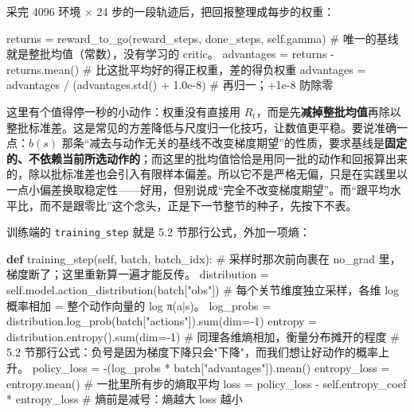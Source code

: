 \documentclass[
  chinese,
]{ctexart}
\newenvironment{Shaded}{\begin{snugshade}}{\end{snugshade}}
\newcommand{\BuiltInTok}[1]{\textcolor[rgb]{0.00,0.23,0.31}{#1}}
\newcommand{\CommentTok}[1]{\textcolor[rgb]{0.37,0.37,0.37}{#1}}
\newcommand{\DecValTok}[1]{\textcolor[rgb]{0.68,0.00,0.00}{#1}}
\newcommand{\FloatTok}[1]{\textcolor[rgb]{0.68,0.00,0.00}{#1}}
\newcommand{\KeywordTok}[1]{\textcolor[rgb]{0.00,0.23,0.31}{\textbf{#1}}}
\newcommand{\NormalTok}[1]{\textcolor[rgb]{0.00,0.23,0.31}{#1}}
\newcommand{\OperatorTok}[1]{\textcolor[rgb]{0.37,0.37,0.37}{#1}}
\newcommand{\StringTok}[1]{\textcolor[rgb]{0.13,0.47,0.30}{#1}}
\newcommand{\VariableTok}[1]{\textcolor[rgb]{0.07,0.07,0.07}{#1}}
\begin{document}
采完 4096 环境 × 24 步的一段轨迹后，把回报整理成每步的权重：

\begin{Shaded}
\begin{Highlighting}[]
\NormalTok{        returns }\OperatorTok{=}\NormalTok{ reward\_to\_go(reward\_steps, done\_steps, }\VariableTok{self}\NormalTok{.gamma)}
        \CommentTok{\# 唯一的基线就是整批均值（常数），没有学习的 critic。}
\NormalTok{        advantages }\OperatorTok{=}\NormalTok{ returns }\OperatorTok{{-}}\NormalTok{ returns.mean()    }\CommentTok{\# 比这批平均好的得正权重，差的得负权重}
\NormalTok{        advantages }\OperatorTok{=}\NormalTok{ advantages }\OperatorTok{/}\NormalTok{ (advantages.std() }\OperatorTok{+} \FloatTok{1.0e{-}8}\NormalTok{)    }\CommentTok{\# 再归一；+1e{-}8 防除零}
\end{Highlighting}
\end{Shaded}

这里有个值得停一秒的小动作：权重没有直接用
\(R_t\)，而是先\textbf{减掉整批均值}再除以整批标准差。这是常见的方差降低与尺度归一化技巧，让数值更平稳。要说准确一点：\(b(s)\)
那条``减去与动作无关的基线不改变梯度期望''的性质，要求基线是\textbf{固定的、不依赖当前所选动作的}；而这里的批均值恰恰是用同一批的动作和回报算出来的，除以批标准差也会引入有限样本偏差。所以它不是严格无偏，只是在实践里以一点小偏差换取稳定性------好用，但别说成``完全不改变梯度期望''。而``跟平均水平比，而不是跟零比''这个念头，正是下一节整节的种子，先按下不表。

训练端的 \texttt{training\_step} 就是 5.2 节那行公式，外加一项熵：

\begin{Shaded}
\begin{Highlighting}[]
    \KeywordTok{def}\NormalTok{ training\_step(}\VariableTok{self}\NormalTok{, batch, batch\_idx):}
        \CommentTok{\# 采样时那次前向裹在 no\_grad 里，梯度断了；这里重新算一遍才能反传。}
\NormalTok{        distribution }\OperatorTok{=} \VariableTok{self}\NormalTok{.model.action\_distribution(batch[}\StringTok{"obs"}\NormalTok{])}
        \CommentTok{\# 每个关节维度独立采样，各维 log 概率相加 = 整个动作向量的 log π(a|s)。}
\NormalTok{        log\_probs }\OperatorTok{=}\NormalTok{ distribution.log\_prob(batch[}\StringTok{"actions"}\NormalTok{]).}\BuiltInTok{sum}\NormalTok{(dim}\OperatorTok{={-}}\DecValTok{1}\NormalTok{)}
\NormalTok{        entropy }\OperatorTok{=}\NormalTok{ distribution.entropy().}\BuiltInTok{sum}\NormalTok{(dim}\OperatorTok{={-}}\DecValTok{1}\NormalTok{)    }\CommentTok{\# 同理各维熵相加，衡量分布摊开的程度}
        \CommentTok{\# 5.2 节那行公式：负号是因为梯度下降只会"下降"，而我们想让好动作的概率上升。}
\NormalTok{        policy\_loss }\OperatorTok{=} \OperatorTok{{-}}\NormalTok{(log\_probs }\OperatorTok{*}\NormalTok{ batch[}\StringTok{"advantages"}\NormalTok{]).mean()}
\NormalTok{        entropy\_loss }\OperatorTok{=}\NormalTok{ entropy.mean()    }\CommentTok{\# 一批里所有步的熵取平均}
\NormalTok{        loss }\OperatorTok{=}\NormalTok{ policy\_loss }\OperatorTok{{-}} \VariableTok{self}\NormalTok{.entropy\_coef }\OperatorTok{*}\NormalTok{ entropy\_loss    }\CommentTok{\# 熵前是减号：熵越大 loss 越小}
\end{Highlighting}
\end{Shaded}
\end{document}
